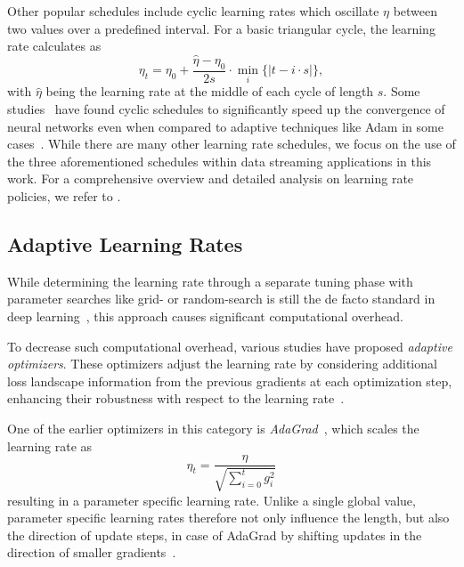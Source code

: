 \documentclass[letterpaper]{article} %
\begin{document}
Other popular schedules include cyclic learning rates which oscillate $\eta$ between two values over a predefined interval.
For a basic triangular cycle, the learning rate calculates as
\begin{equation}
	\eta_t = \eta_0 + \frac{\hat{\eta} - \eta_0}{2s} \cdot \min_{i} \{|t-i\cdot s|\},
\end{equation}
with $\hat{\eta}$ being the learning rate at the middle of each cycle of length $s$.
Some studies~\cite{smithCyclicalLearningRates2017, smithSuperConvergenceVeryFast2018a} have found cyclic schedules to significantly speed up the convergence of neural networks even when compared to adaptive techniques like Adam in some cases~\cite{kingmaAdamMethodStochastic2017b}.
While there are many other learning rate schedules, we focus on the use of the three aforementioned schedules within data streaming applications in this work.
For a comprehensive overview and detailed analysis on learning rate policies, we refer to \citet{wuDemystifyingLearningRate2019b}.

\subsection{Adaptive Learning Rates}

While determining the learning rate through a separate tuning phase with parameter searches like grid- or random-search is still the de facto standard in deep learning~\cite{defazioLearningRateFreeLearningDAdaptation2023a}, this approach causes significant computational overhead.

To decrease such computational overhead, various studies have proposed \textit{adaptive optimizers}.
These optimizers adjust the learning rate by considering additional loss landscape information from the previous gradients at each optimization step, enhancing their robustness with respect to the learning rate~\cite{duchiAdaptiveSubgradientMethods2011}.

One of the earlier optimizers in this category is \textit{AdaGrad}~\cite{duchiAdaptiveSubgradientMethods2011}, which scales the learning rate as
\begin{equation}
	\eta_t = \frac{\eta}{\sqrt{\sum_{i=0}^{t} g_i^2}}
\end{equation}
resulting in a parameter specific learning rate.
Unlike a single global value, parameter specific learning rates therefore not only influence the length, but also the direction of update steps, in case of AdaGrad by shifting updates in the direction of smaller gradients~\cite{wuWNGradLearnLearning2020}. %
\end{document}
